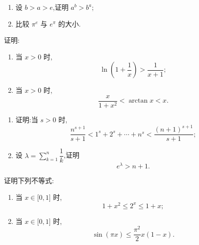 \documentclass[../数学分析培优讲义.tex]{subfiles}
\begin{document}
\begin{example}
\begin{enumerate}[label=(\arabic*)]
    \item 设 $b>a>e$,证明 $a^b>b^a$;
    \item 比较 $\pi^e$ 与 $e^\pi$ 的大小.
\end{enumerate}
\end{example}
\exampleblank


\newpage


\begin{example}
证明:
\begin{enumerate}[label=(\arabic*)]
    \item 当 $x>0$ 时,
    \[
        \ln\left(1+\dfrac{1}{x}\right)>\dfrac{1}{x+1};
    \]
    \item 当 $x>0$ 时,
    \[
        \dfrac{x}{1+x^2}<\arctan x<x.
    \]
\end{enumerate}
\end{example}
\exampleblank

\begin{example}
\begin{enumerate}[label=(\arabic*)]
    \item 证明:当 $s>0$ 时,
    \[
        \dfrac{n^{s+1}}{s+1}
        <1^s+2^s+\cdots+n^s
        <\dfrac{(n+1)^{s+1}}{s+1};
    \]
    \item 设 $\displaystyle\lambda=\sum\limits_{k=1}^n\dfrac{1}{k}$,证明
    \[
        e^\lambda>n+1.
    \]
\end{enumerate}
\end{example}
\exampleblank


\newpage


\begin{example}
证明下列不等式:
\begin{enumerate}[label=(\arabic*)]
    \item 当 $x\in\lbrack 0,1\rbrack$ 时,
    \[
        1+x^2\leq2^x\leq1+x;
    \]
    \item 当 $x\in\lbrack 0,1\rbrack$ 时,
    \[
        \sin(\pi x)\leq\dfrac{\pi^2}{2}x(1-x).
    \]
\end{enumerate}
\end{example}
\exampleblank
\end{document}
